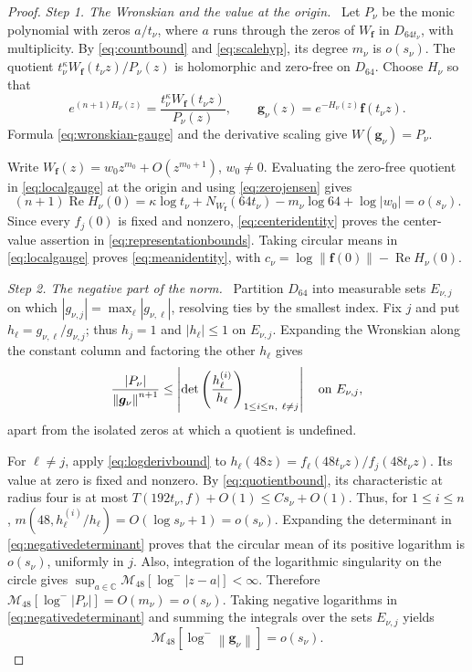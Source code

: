 \documentclass[11pt,letterpaper,reqno]{amsart}
\theoremstyle{remark}
\numberwithin{equation}{section}
\newcommand{\C}{\mathbb C}
\newcommand{\mean}[2]{\mathcal M_{#1}\!\left[#2\right]}
\newcommand{\norm}[1]{\left\lVert#1\right\rVert}
\newcommand{\fv}{\bm f}
\newcommand{\gv}{\bm g}
\DeclareMathOperator{\Ree}{Re}
\newcommand{\step}[1]{\medskip\noindent\emph{#1}\ }
\begin{document}
\begin{proof}
\step{Step 1. The Wronskian and the value at the origin.}
Let $P_\nu$ be the monic polynomial with zeros $a/t_\nu$, where $a$ runs
through the zeros of $W_{\fv}$ in $D_{64t_\nu}$, with multiplicity.
By \eqref{eq:countbound} and \eqref{eq:scalehyp}, its degree
$m_\nu$ is $o(s_\nu)$. The quotient
$t_\nu^\kappa W_{\fv}(t_\nu z)/P_\nu(z)$ is holomorphic and zero-free on
$D_{64}$. Choose $H_\nu$ so that
\begin{equation}\label{eq:localgauge}
 e^{(n+1)H_\nu(z)}=\frac{t_\nu^\kappa W_{\fv}(t_\nu z)}{P_\nu(z)},
 \qquad \gv_\nu(z)=e^{-H_\nu(z)}\fv(t_\nu z).
\end{equation}
Formula \eqref{eq:wronskian-gauge} and the derivative scaling give
$W(\gv_\nu)=P_\nu$.

Write $W_{\fv}(z)=w_0z^{m_0}+O(z^{m_0+1})$, $w_0\ne0$.
Evaluating the zero-free quotient in \eqref{eq:localgauge} at the origin
and using \eqref{eq:zerojensen} gives
\begin{equation}\label{eq:centeridentity}
 (n+1)\Ree H_\nu(0)=\kappa\log t_\nu+N_{W_{\fv}}(64t_\nu)
                  -m_\nu\log64+\log|w_0|=o(s_\nu).
\end{equation}
Since every $f_j(0)$ is fixed and nonzero, \eqref{eq:centeridentity} proves the center-value
assertion in \eqref{eq:representationbounds}. Taking circular means in
\eqref{eq:localgauge} proves \eqref{eq:meanidentity}, with
$c_\nu=\log\norm{\fv(0)}-\Ree H_\nu(0)$.

\step{Step 2. The negative part of the norm.}
Partition $D_{64}$ into measurable sets $E_{\nu,j}$ on which
$|g_{\nu,j}|=\max_\ell|g_{\nu,\ell}|$, resolving ties by the smallest
index. Fix $j$ and put $h_\ell=g_{\nu,\ell}/g_{\nu,j}$; thus
$h_j=1$ and $|h_\ell|\le1$ on $E_{\nu,j}$. Expanding the Wronskian along
the constant column and factoring the other $h_\ell$ gives
\begin{equation}\label{eq:negativedeterminant}
 \frac{|P_\nu|}{\norm{\gv_\nu}^{n+1}}
 \le\left|\det\left(\frac{h_\ell^{(i)}}{h_\ell}\right)_{
                      1\le i\le n,\ \ell\ne j}\right|
 \quad\hbox{on }E_{\nu,j},
\end{equation}
apart from the isolated zeros at which a quotient is undefined.

For $\ell\ne j$, apply \eqref{eq:logderivbound} to
$h_\ell(48z)=f_\ell(48t_\nu z)/f_j(48t_\nu z)$.
Its value at zero is fixed and nonzero. By \eqref{eq:quotientbound}, its
characteristic at radius four is at most $T(192t_\nu,f)+O(1)\le Cs_\nu+O(1)$.
Thus, for $1\le i\le n$,
$m(48,h_\ell^{(i)}/h_\ell)=O(\log s_\nu+1)=o(s_\nu)$.
Expanding the determinant in \eqref{eq:negativedeterminant} proves that the
circular mean of its positive logarithm is $o(s_\nu)$, uniformly in $j$.
Also, integration of the logarithmic singularity on the circle gives
$\sup_{a\in\C}\mean{48}{\log^-|z-a|}<\infty$. Therefore
$\mean{48}{\log^-|P_\nu|}=O(m_\nu)=o(s_\nu)$.
Taking negative logarithms in \eqref{eq:negativedeterminant} and summing the
integrals over the sets $E_{\nu,j}$ yields
\begin{equation}\label{eq:negativepart}
 \mean{48}{\log^-\norm{\gv_\nu}}=o(s_\nu).
\end{equation}


\end{proof}
\end{document}
